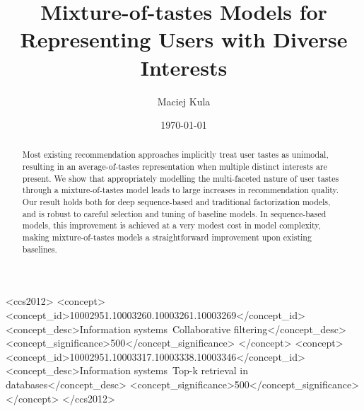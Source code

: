 \documentclass[sigconf]{acmart}
\begin{document}


\title{Mixture-of-tastes Models for Representing Users with Diverse Interests}
\author{Maciej Kula}
\date{\today}

\begin{CCSXML}
<ccs2012>
<concept>
<concept_id>10002951.10003260.10003261.10003269</concept_id>
<concept_desc>Information systems~Collaborative filtering</concept_desc>
<concept_significance>500</concept_significance>
</concept>
<concept>
<concept_id>10002951.10003317.10003338.10003346</concept_id>
<concept_desc>Information systems~Top-k retrieval in databases</concept_desc>
<concept_significance>500</concept_significance>
</concept>
</ccs2012>
\end{CCSXML}



\begin{abstract}
Most existing recommendation approaches implicitly treat user tastes as unimodal, resulting in an average-of-tastes representation when multiple distinct interests are present. We show that appropriately modelling the multi-faceted nature of user tastes through a mixture-of-tastes model leads to large increases in recommendation quality. Our result holds both for deep sequence-based and traditional factorization models, and is robust to careful selection and tuning of baseline models. In sequence-based models, this improvement is achieved at a very modest cost in model complexity, making mixture-of-tastes models a straightforward improvement upon existing baselines.
\end{abstract}

\maketitle
\end{document}
